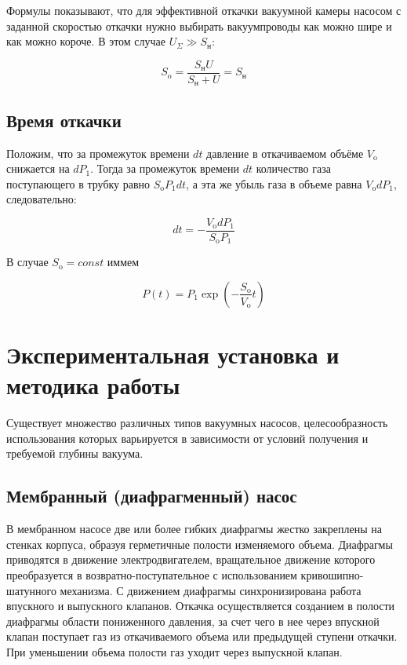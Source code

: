 \documentclass[a4paper, 12pt]{article} %
\begin{document}
Формулы показывают, что для эффективной
откачки вакуумной камеры насосом с заданной скоростью откачки нужно
выбирать вакуумпроводы как можно шире и как можно короче. В этом
случае $U_{\Sigma} \gg S_{\text{н}}$:

\begin{equation}
	S_{\text{o}} = \frac{S_{\text{н}} U}{S_{\text{н}} + U} = S_{\text{н}}
\end{equation}

\subsection{Время откачки}

Положим, что за промежуток времени $dt$ давление
в откачиваемом объёме $V_{\text{o}}$ снижается на $dP_1$. Тогда за промежуток времени $dt$ количество газа поступающего в трубку равно $S_{\text{o}} P_1 dt$, а эта же
убыль газа в объеме равна $V_{\text{o}} dP_1$, следовательно:

\begin{equation}
	dt = - \frac{V_{\text{o}} dP_1}{S_{\text{o}}P_1}
\end{equation}

В случае $S_{\text{o}} = const$ иммем 

\begin{equation}
	P(t) = P_1 \exp \left( - \frac{S_{\text{o}}}{V_{\text{o}}}t \right)
\end{equation}


\section{Экспериментальная установка и методика работы}

Существует множество различных типов вакуумных насосов, целесообразность использования которых варьируется в зависимости от условий получения и требуемой глубины вакуума.

\subsection{Мембранный (диафрагменный) насос}

В мембранном насосе две или более гибких диафрагмы жестко закреплены на стенках корпуса, образуя герметичные полости изменяемого объема. Диафрагмы приводятся в движение
электродвигателем, вращательное движение которого преобразуется
в возвратно-поступательное с использованием кривошипно-шатунного
механизма. С движением диафрагмы синхронизирована работа
впускного и выпускного клапанов. Откачка осуществляется созданием
в полости диафрагмы области пониженного давления, за счет чего в нее через впускной клапан поступает газ из откачиваемого объема или предыдущей ступени откачки. При уменьшении объема полости газ уходит через выпускной клапан.
\end{document}
